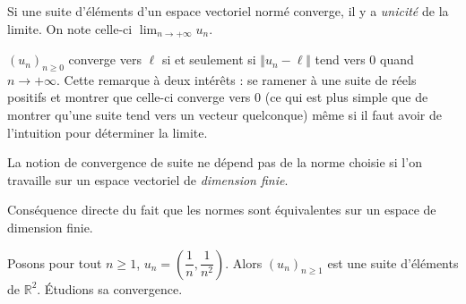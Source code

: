 \documentclass[french,11pt,twoside]{VcCours}
\begin{document}
\begin{Theoreme}{} Si une suite d'éléments d'un espace vectoriel normé converge, il y a \emph{unicité} de la limite. On note celle-ci $\lim_{n \rightarrow + \infty} u_n$.
\end{Theoreme}

\begin{Remarque}{} $(u_n)_{n \geq 0}$ converge vers $\ell$ si et seulement si $\Vert u_n - \ell \Vert$ tend vers $0$ quand $n \rightarrow + \infty$.  Cette remarque à deux intérêts : se ramener à une suite de réels positifs et montrer que celle-ci converge vers $0$ (ce qui est plus simple que de montrer qu'une suite tend vers un vecteur quelconque) même si il faut avoir de l'intuition pour déterminer la limite.
\end{Remarque}

\begin{Theoreme}{} La notion de convergence de suite ne dépend pas de la norme choisie si l'on travaille sur un espace vectoriel de \emph{dimension finie}.
\end{Theoreme}

\begin{Demonstration}{} Conséquence directe du fait que les normes sont équivalentes sur un espace de dimension finie.
\end{Demonstration}

\begin{Exemple} Posons pour tout $n \geq 1$, $u_n = \left( \dfrac{1}{n}, \dfrac{1}{n^2} \right)$. Alors $(u_n)_{n \geq 1}$ est une suite d'éléments de $\mathbb{R}^2$. Étudions sa convergence.

%
%
%

\vspace{6cm}
\end{Exemple}
\end{document}
